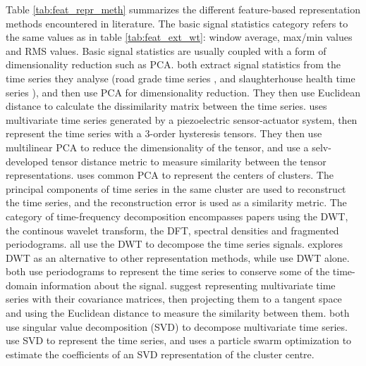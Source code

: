 Table \ref{tab:feat_repr_meth} summarizes the different feature-based representation methods encountered in literature. 
The basic signal statistics category refers to the same values as in table \ref{tab:feat_ext_wt}: window average, max/min values and RMS values.
Basic signal statistics are usually coupled with a form of dimensionality reduction such as PCA. 
\textcite{tsc_slaughterhouse, road_grade_china_pca_kmeans} both extract signal statistics from the time series they analyse (road grade time series \cite{road_grade_china_pca_kmeans}, and slaughterhouse health time series \cite{tsc_slaughterhouse}),
and then use PCA for dimensionality reduction. They then use Euclidean distance to calculate the dissimilarity matrix between the time series.
\textcite{hysteresis_tsc_tensor_decomp} uses multivariate time series generated by a piezoelectric sensor-actuator system, 
then represent the time series with a 3-order hysteresis tensors.
They then use multilinear PCA to reduce the dimensionality of the tensor, and use a selv-developed tensor distance metric to measure similarity between the tensor representations.
\textcite{multivariate_tsc_common_pca} uses common PCA to represent the centers of clusters.
The principal components of time series in the same cluster are used to reconstruct the time series, and the reconstruction error is used as a similarity metric.
The category of time-frequency decomposition encompasses papers using the DWT, the continous wavelet transform, the DFT, spectral densities and fragmented periodograms.
\textcite{shape_feat_mod_tsc_rfa, ambient_air_vape_k_means, dwt_hac_kmeans_som} all use the DWT to decompose the time series signals. 
\textcite{shape_feat_mod_tsc_rfa} explores DWT as an alternative to other representation methods, while \textcite{ambient_air_vape_k_means, dwt_hac_kmeans_som} use DWT alone.
\textcite{fragmented_periodogram, BSLEX_nonlin_nonstat_tsc} both use periodograms to represent the time series to conserve some of the time-domain information about the signal. 
\textcite{multivar_tsc_riemann_manifold} suggest representing multivariate time series with their covariance matrices, then projecting them to a tangent space and using the Euclidean distance to measure the similarity between them.
\textcite{fuzzy_c_means_pso_svd, svd_birch_tsc_stock_price} both use singular value decomposition (SVD) to decompose multivariate time series. 
\textcite{fuzzy_c_means_pso_svd} use SVD to represent the time series, and uses a particle swarm optimization to estimate the coefficients of an SVD representation of the cluster centre.
